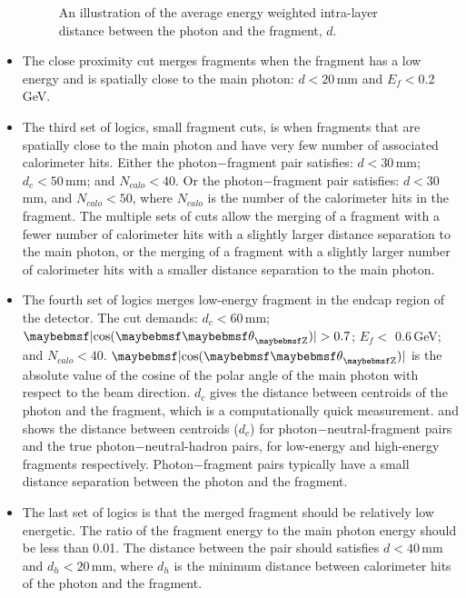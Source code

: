 \begin{itemize}
\begin{figure}[tbph]
\caption{An illustration of  the average energy weighted intra-layer distance between the photon and the fragment, $d$.}
\label{fig:photonDistanceMetric}
\end{figure}
  \item The close proximity cut merges fragments  when the fragment has a low energy and is spatially close to the main photon: $d < 20 $\,mm and  $E_f<$0.2\,GeV.
  \item The third set of logics, small fragment cuts,  is when fragments that are spatially close to the main photon and have very few number of associated calorimeter hits. Either the  photon$-$fragment pair satisfies:  $d < 30 $\,mm; $d_c < 50 $\,mm; and $N_{calo}<40$. Or the  photon$-$fragment pair satisfies: $d < 30 $\,mm, and $N_{calo}<50$, where $N_{calo}$ is the number of the calorimeter  hits  in the fragment. The multiple sets of cuts allow the merging of a fragment with a fewer number of  calorimeter hits with a slightly larger distance separation to the main photon, or the merging of a fragment with a slightly larger number of  calorimeter hits with a smaller distance separation to the main photon.

  \item The fourth set of  logics merges low-energy fragment in the  endcap region of the detector. The cut demands: $d_c < 60$\,mm; $\absCosTheta > 0.7$; $E_f<$ 0.6\,GeV; and $N_{calo}<40$. $\absCosTheta$ is the absolute value of the cosine of the polar angle of the main photon with respect to the beam direction. $d_c$ gives the distance between centroids of the photon and the fragment, which is a computationally quick measurement.   and  shows the distance between centroids ($d_c$)  for photon$-$neutral-fragment pairs and the true photon$-$neutral-hadron pairs, for low-energy and high-energy fragments respectively. Photon$-$fragment pairs typically have a small distance separation between the photon and the fragment.

  \item The last set of  logics is that the merged fragment should be relatively low energetic. The ratio of the fragment energy  to the main photon energy should be less than 0.01. The distance between the pair should satisfies $d < 40$\,mm and $d_h < 20$\,mm, where  $d_h$ is the minimum distance between calorimeter hits of the photon and the fragment.
\end{itemize}




